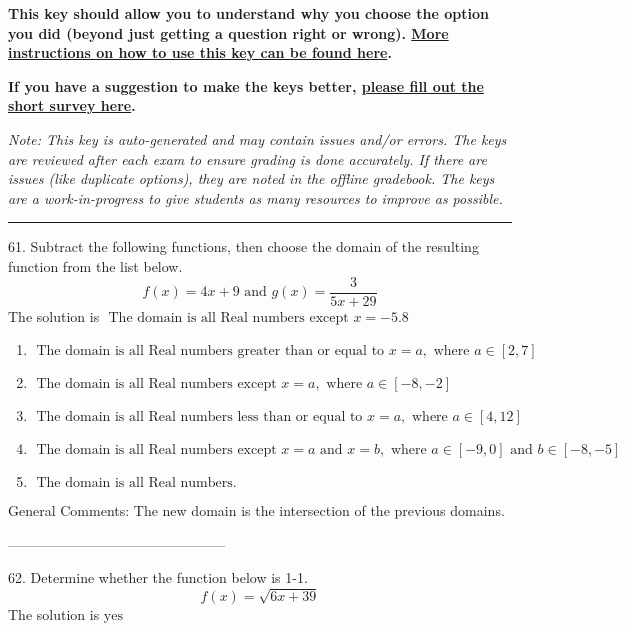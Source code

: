 \documentclass{article}[14pt]
\begin{document}
\textbf{This key should allow you to understand why you choose the option you did (beyond just getting a question right or wrong). \href{https://xronos.clas.ufl.edu/mac1105spring2020/courseDescriptionAndMisc/Exams/LearningFromResults}{More instructions on how to use this key can be found here}.}

\textbf{If you have a suggestion to make the keys better, \href{https://forms.gle/CZkbZmPbC9XALEE88}{please fill out the short survey here}.}

\textit{Note: This key is auto-generated and may contain issues and/or errors. The keys are reviewed after each exam to ensure grading is done accurately. If there are issues (like duplicate options), they are noted in the offline gradebook. The keys are a work-in-progress to give students as many resources to improve as possible.}

\rule{\textwidth}{0.4pt}

61. Subtract the following functions, then choose the domain of the resulting function from the list below.
$$ f(x) = 4x + 9 \text{ and } g(x) = \frac{3}{5x+29} $$ 
The solution is $ \text{ The domain is all Real numbers except } x = -5.8 $ 

\begin{enumerate}[label=\Alph*.] 
\item $ \text{ The domain is all Real numbers greater than or equal to } x = a, \text{ where } a \in [2, 7] $ 

  
\item $ \text{ The domain is all Real numbers except } x = a, \text{ where } a \in [-8, -2] $ 

  
\item $ \text{ The domain is all Real numbers less than or equal to } x = a, \text{ where } a \in [4, 12] $ 

  
\item $ \text{ The domain is all Real numbers except } x = a \text{ and } x = b, \text{ where } a \in [-9, 0] \text{ and } b \in [-8, -5] $ 

  
\item $ \text{ The domain is all Real numbers. } $ 

  
\end{enumerate} 
 
General Comments: The new domain is the intersection of the previous domains.

-----------------------------------------------

62. Determine whether the function below is 1-1.
$$ f(x) = \sqrt{6 x + 39} $$ 
The solution is $ \text{yes} $ 
\end{document}
